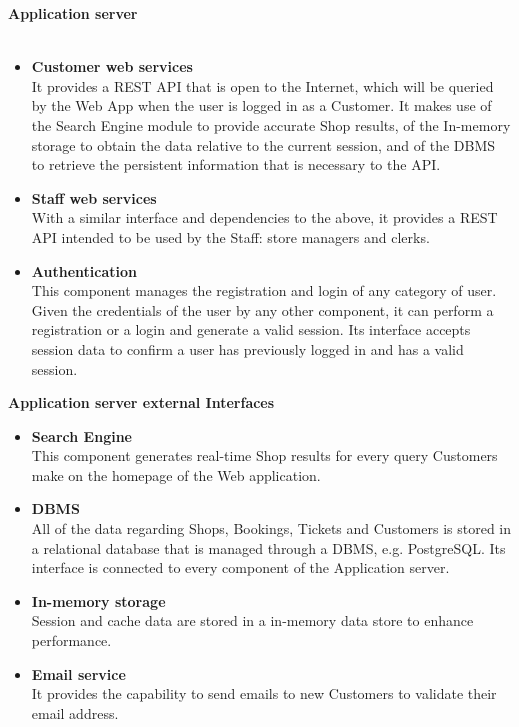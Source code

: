 \noindent\textbf{Application server}\\\\
\begin{itemize}
    \item \textbf{Customer web services}\\ It provides a REST API that is open to the Internet, which will be queried by the Web App when the user is logged in as a Customer. It makes use of the Search Engine module to provide accurate Shop results, of the In-memory storage to obtain the data relative to the current session, and of the DBMS to retrieve the persistent information that is necessary to the API.
    \item \textbf{Staff web services}\\ With a similar interface and dependencies to the above, it provides a REST API intended to be used by the Staff: store managers and clerks. 
    \item \textbf{Authentication}\\ This component manages the registration and login of any category of user. Given the credentials of the user by any other component, it can perform a registration or a login and generate a valid session. Its interface accepts session data to confirm a user has previously logged in and has a valid session.
    
\end{itemize}
\noindent\textbf{Application server external Interfaces}
\begin{itemize}
    \item \textbf{Search Engine}\\ This component generates real-time Shop results for every query Customers make on the homepage of the Web application.
    \item \textbf{DBMS}\\ All of the data regarding Shops, Bookings, Tickets and Customers is stored in a relational database that is managed through a DBMS, e.g. PostgreSQL. Its interface is connected to every component of the Application server.
    \item \textbf{In-memory storage}\\ Session and cache data are stored in a in-memory data store to enhance performance.
    \item \textbf{Email service}\\ It provides the capability to send emails to new Customers to validate their email address.
\end{itemize}




